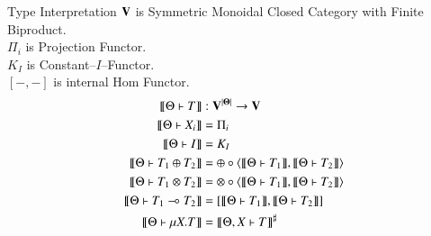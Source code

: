 \documentclass[10pt]{jsarticle}
\newcommand{\semantics}[1]{{\llbracket #1 \rrbracket}}
\begin{document}
\begin{itembox}[c]{Type Interpretation}
$\bf{V}$ is Symmetric Monoidal Closed Category with Finite Biproduct.\\
$\Pi_i$ is Projection Functor. \\
$K_I$ is Constant--$I$--Functor. \\
$[-,-]$ is internal Hom Functor. \\
  \begin{align*}
    \semantics{\Theta \vdash T}                 &: \bf{V}^{|\Theta|} \rightarrow \bf{V} \\
    \semantics{\Theta \vdash X_i}               &= \Pi_i \\
    \semantics{\Theta \vdash I}                 &= K_I \\
    \semantics{\Theta \vdash T_1\oplus{}T_2}    &= \oplus\circ\langle\semantics{\Theta \vdash T_1},\semantics{\Theta \vdash T_2}\rangle \\
    \semantics{\Theta \vdash T_1\otimes{}T_2}   &= \otimes\circ\langle\semantics{\Theta \vdash T_1},\semantics{\Theta \vdash T_2}\rangle \\
    \semantics{\Theta \vdash T_1\multimap{}T_2} &= [\semantics{\Theta \vdash T_1},\semantics{\Theta \vdash T_2}] \\
    \semantics{\Theta \vdash \mu{X}.T}          &= \semantics{\Theta,X \vdash T}^\sharp
  \end{align*}
\end{itembox}
\end{document}

